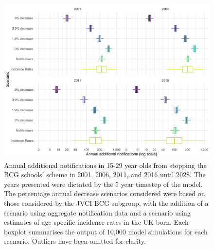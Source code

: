 \documentclass[11pt,twoside]{bristolthesis}
\begin{document}
  \begin{figure}
  
  {\centering \includegraphics[width=0.8\linewidth]{chapters/evidence-policy-change/graph-avg-add-nots-1} 
  
  }
  
  \caption{Annual additional notifications in 15-29 year olds from stopping the BCG schools' scheme in 2001, 2006, 2011, and 2016 until 2028. The years presented were dictated by the 5 year timestep of the model. The percentage annual decrease scenarios considered were based on those considered by the JVCI BCG subgroup, with the addition of a scenario using aggregate notification data and a scenario using estimates of age-specific incidence rates in the UK born. Each boxplot summarises the output of 10,000 model simulations for each scenario. Outliers have been omitted for clarity.}\label{fig:graph-avg-add-not}
  \end{figure}
\end{document}
